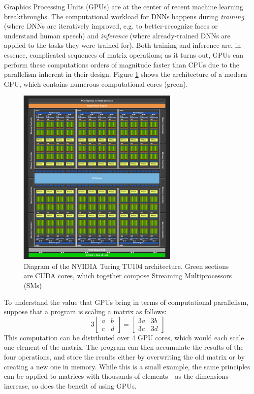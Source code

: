 \documentclass[12pt,letterpaper]{article}
\begin{document}
Graphics Processing Units (GPUs) are at the center of recent machine learning breakthroughs. The computational workload for DNNs happens during \textit{training} (where DNNs are iteratively improved, e.g. to better-recognize faces or understand human speech) and \textit{inference}  (where already-trained DNNs are applied to the tasks they were trained for). Both training and inference are, in essence, complicated sequences of matrix operations; as it turns out, GPUs can perform these computations orders of magnitude faster than CPUs due to the parallelism inherent in their design. Figure \ref{fig:turing} shows the architecture of a modern GPU, which contains numerous computational cores (green).

\begin{figure}[ht]
\centering
\includegraphics[width=0.7\textwidth]{Turing_TU104_chip_diagram.png}
\captionsetup{width=0.7\linewidth}
\caption{ Diagram of the NVIDIA Turing TU104 architecture. Green sections are CUDA cores, which together compose Streaming Multiprocessors (SMs) \cite{turing_architecture}}
\label{fig:turing}
\end{figure}

To understand the value that GPUs bring in terms of computational parallelism, suppose that a program is scaling a matrix as follows:
\[
3
\begin{bmatrix}
    a  &  b      \\
    c  &  d      
\end{bmatrix} 
=
\begin{bmatrix}
    3a  &  3b      \\
    3c  &  3d      
\end{bmatrix} 
\]
This computation can be distributed over 4 GPU cores, which would each scale one element of the matrix. The program can then accumulate the results of the four operations, and store the results either by overwriting the old matrix or by creating a new one in memory. While this is a small example, the same principles can be applied to matrices with thousands of elements - as the dimensions increase, so does the benefit of using GPUs. 
\par
\end{document}
